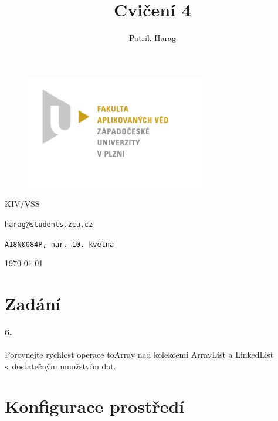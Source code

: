 \documentclass[12pt, a4paper]{article}
\title{Cvičení 4}
\author{Patrik Harag}
\makeatletter
\def \thesubtitle {KIV/VSS}
\def \theauthoremail {harag@students.zcu.cz}
\def \theauthorid {A18N0084P, nar. 10. května}
\makeatother
\begin{document}
	
	\begin{titlepage}
		\begin{figure}
			\includegraphics[height=50mm]{img-fav-logo}
		\end{figure}
		
		\centering
		{\large \hspace{1mm} \par} %
		\vspace{15ex}
		
		{\huge\bfseries \thetitle \par}
		\vspace{2ex}
		{\scshape\Large \thesubtitle \par}
		\vspace{15ex}
		{\Large\itshape \theauthor \par}
		\vspace{2ex}
		{\texttt{\theauthoremail} \par}
		\vspace{1ex}
		{\texttt{\theauthorid} \par}
		
		\vfill
		
		{\today\par}
	\end{titlepage}
	
	\section*{Zadání}
	
	\paragraph{6.}
	Porovnejte rychlost operace toArray nad kolekcemi ArrayList a LinkedList s~dostatečným množstvím dat.
	
	\section*{Konfigurace prostředí}
\end{document}
